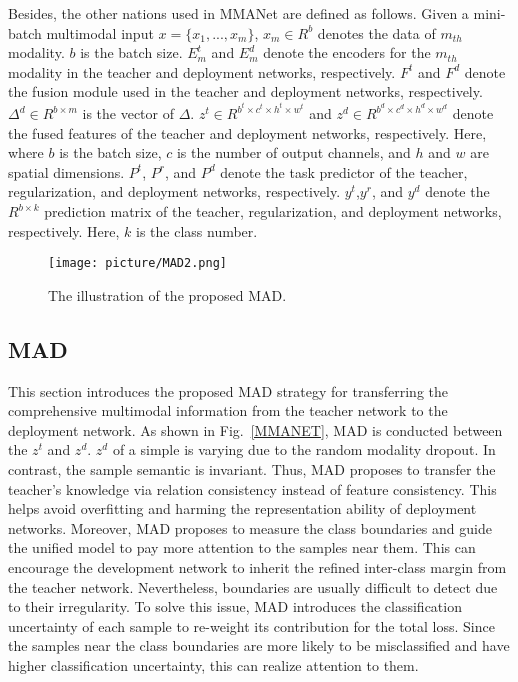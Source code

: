 \documentclass[10pt,twocolumn,letterpaper]{article}
\begin{document}
Besides, the other nations used in MMANet are defined as follows. Given a mini-batch multimodal input $x=\{x_{1},...,x_{m}\}$, $x_{m} \in R^{b}$ denotes the data of $m_{th}$ modality. $b$ is the batch size. $E_{m}^{t}$ and $E_{m}^{d}$ denote the encoders for the $m_{th}$ modality in the teacher and deployment networks, respectively. $F^{t}$ and $F^{d}$ denote the fusion module used in the teacher and deployment networks, respectively. $\Delta^{d}\in R^{b\times m}$ is the vector of $\Delta$. $z^{t} \in R^{b^{t} \times c^{t} \times h^{t} \times w^{t}}$ and $z^{d} \in R^{b^{d} \times c^{d} \times h^{d} \times w^{d}}$ denote the fused features of the teacher and deployment networks, respectively. Here, where $b$ is the batch size, $c$ is the number of output channels, and $h$ and $w$ are spatial dimensions. $P^{t}$, $P^{r}$, and $P^{d}$ denote the task predictor of the teacher, regularization, and deployment networks, respectively. $y^{t}$,$y^{r}$, and $y^{d}$ denote the $R^{b \times k}$ prediction matrix of the teacher, regularization, and deployment networks, respectively. Here, $k$ is the class number.


\begin{figure}[t]
\centering
\texttt{[image: picture/MAD2.png]} \caption{The illustration of the proposed MAD.}
\label{MAD}
\end{figure}


\subsection{MAD}

This section introduces the proposed MAD strategy for transferring the comprehensive multimodal information from the teacher network to the deployment network. As shown in Fig.~\ref{MMANET}, MAD is conducted between the $z^{t}$ and $z^{d}$. $z^{d}$ of a simple is varying due to the random modality dropout. In contrast, the sample semantic is invariant. Thus, MAD proposes to transfer the teacher's knowledge via relation consistency instead of feature consistency. This helps avoid overfitting and harming the representation ability of deployment networks. Moreover, MAD proposes to measure the class boundaries and guide the unified model to pay more attention to the samples near them. This can encourage the development network to inherit the refined inter-class margin from the teacher network. Nevertheless, boundaries are usually difficult to detect due to their irregularity. To solve this issue, MAD introduces the classification uncertainty of each sample to re-weight its contribution for the total loss. Since the samples near the class boundaries are more likely to be misclassified and have higher classification uncertainty, this can realize attention to them. 
\end{document}
